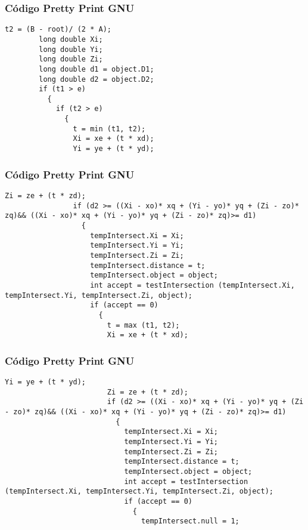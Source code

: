 \documentclass{beamer}
\begin{document}
\begin{frame}[fragile]
\frametitle{C\'odigo Pretty Print GNU}
\begin{lstlisting}[style=CStyle]
        t2 = (B - root)/ (2 * A);
        long double Xi;
        long double Yi;
        long double Zi;
        long double d1 = object.D1;
        long double d2 = object.D2;
        if (t1 > e)
          {
            if (t2 > e)
              {
                t = min (t1, t2);
                Xi = xe + (t * xd);
                Yi = ye + (t * yd);
\end{lstlisting}
\end{frame}
\begin{frame}[fragile]
\frametitle{C\'odigo Pretty Print GNU}
\begin{lstlisting}[style=CStyle]
                Zi = ze + (t * zd);
                if (d2 >= ((Xi - xo)* xq + (Yi - yo)* yq + (Zi - zo)* zq)&& ((Xi - xo)* xq + (Yi - yo)* yq + (Zi - zo)* zq)>= d1)
                  {
                    tempIntersect.Xi = Xi;
                    tempIntersect.Yi = Yi;
                    tempIntersect.Zi = Zi;
                    tempIntersect.distance = t;
                    tempIntersect.object = object;
                    int accept = testIntersection (tempIntersect.Xi, tempIntersect.Yi, tempIntersect.Zi, object);
                    if (accept == 0)
                      {
                        t = max (t1, t2);
                        Xi = xe + (t * xd);
\end{lstlisting}
\end{frame}
\begin{frame}[fragile]
\frametitle{C\'odigo Pretty Print GNU}
\begin{lstlisting}[style=CStyle]
                        Yi = ye + (t * yd);
                        Zi = ze + (t * zd);
                        if (d2 >= ((Xi - xo)* xq + (Yi - yo)* yq + (Zi - zo)* zq)&& ((Xi - xo)* xq + (Yi - yo)* yq + (Zi - zo)* zq)>= d1)
                          {
                            tempIntersect.Xi = Xi;
                            tempIntersect.Yi = Yi;
                            tempIntersect.Zi = Zi;
                            tempIntersect.distance = t;
                            tempIntersect.object = object;
                            int accept = testIntersection (tempIntersect.Xi, tempIntersect.Yi, tempIntersect.Zi, object);
                            if (accept == 0)
                              {
                                tempIntersect.null = 1;
\end{lstlisting}
\end{frame}
\end{document}
